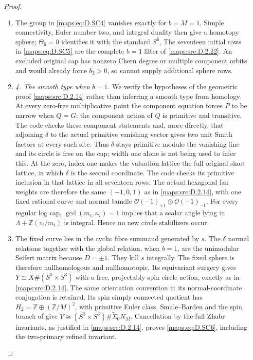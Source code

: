\begin{proof}
\begin{enumerate}[label=\arabic*.,leftmargin=*]
\item The group in \eqref{maps:eq:D.SC4} vanishes exactly for $b=M=1$. Simple connectivity,
Euler number two, and integral duality then give a homotopy sphere;
$\Theta_6=0$ identifies it with the standard $S^6$. The seventeen
initial rows in \eqref{maps:eq:D.SC5} are the complete $b=1$ filter of \ref{maps:src:D.2.22}.
An excluded original cap has nonzero Chern degree or multiple
component orbits and would already force $b_2>0$, so cannot supply
additional sphere rows.

\item \emph{4. The smooth type when $b=1$.}
We verify the hypotheses of the geometric proof \ref{maps:src:D.2.14} rather than
inferring a smooth type from homology. At every zero-free
multiplicative point the component equation forces $P$ to be narrow
when $Q=G$; the component action of $Q$ is primitive and transitive. The code
checks these component statements and, more directly, that adjoining
$\delta$ to the actual primitive vanishing vector gives two unit
Smith factors at every such site. Thus $\delta$ stays primitive
modulo the vanishing line and its circle is free on the cap; width
one alone is not being used to infer this. At the zero, index one makes the valuation lattice the full original
short lattice, in which $\delta$ is the second coordinate. The code
checks its primitive inclusion in that lattice in all seventeen rows.
The actual hexagonal fan weights are therefore the same $(-1,0,1)$ as in \ref{maps:src:D.2.14}, with one fixed rational curve and
normal bundle $\mathcal O(-1)_{+1}\oplus\mathcal O(-1)_{-1}$.
For every regular log cap, $\gcd(m_i,n_i)=1$ implies that a scalar
angle lying in $\Lambda+\mathbb Z(v_i/m_i)$ is integral. Hence no
new circle stabilizers occur.

\item The fixed curve lies in the cyclic fibre summand generated by $s$.
The $\delta$ normal relations together with the global relation,
when $b=1$, are the unimodular Seifert matrix because $D=\pm1$.
They kill $s$ integrally. The fixed sphere is therefore nullhomologous
and nullhomotopic. Its equivariant surgery gives
$Y\cong X\#(S^3\times S^3)$ with a free, projectably spin circle
action, exactly as in \ref{maps:src:D.2.14}. The same orientation convention in its
normal-coordinate conjugation is retained. Its spin simply connected
quotient has $H_2=\mathbb Z\oplus(\mathbb Z/M)^2$, with primitive
Euler class. Smale--Barden and the spin branch of
\cite[Theorem A]{manGR25} give
$Y\cong(S^3\times S^3)\#\widetilde\Sigma_0N_M$.
Cancellation by the full Zhubr invariants, as justified in \ref{maps:src:D.2.14},
proves \eqref{maps:eq:D.SC6}, including the two-primary refined invariant.
\end{enumerate}
\end{proof}


